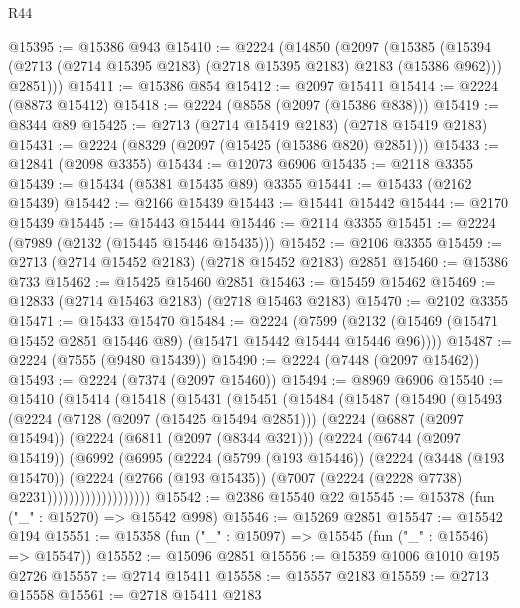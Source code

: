 \begin{lexlean}{R44}
\begin{coremodule}
@15395 := @15386 @943
@15410 := @2224
    (@14850
      (@2097
        (@15385
          (@15394 (@2713 (@2714 @15395 @2183) (@2718 @15395 @2183) @2183 (@15386 @962)))
          @2851)))
@15411 := @15386 @854
@15412 := @2097 @15411
@15414 := @2224 (@8873 @15412)
@15418 := @2224 (@8558 (@2097 (@15386 @838)))
@15419 := @8344 @89
@15425 := @2713 (@2714 @15419 @2183) (@2718 @15419 @2183)
@15431 := @2224 (@8329 (@2097 (@15425 (@15386 @820) @2851)))
@15433 := @12841 (@2098 @3355)
@15434 := @12073 @6906
@15435 := @2118 @3355
@15439 := @15434 (@5381 @15435 @89) @3355
@15441 := @15433 (@2162 @15439)
@15442 := @2166 @15439
@15443 := @15441 @15442
@15444 := @2170 @15439
@15445 := @15443 @15444
@15446 := @2114 @3355
@15451 := @2224 (@7989 (@2132 (@15445 @15446 @15435)))
@15452 := @2106 @3355
@15459 := @2713 (@2714 @15452 @2183) (@2718 @15452 @2183) @2851
@15460 := @15386 @733
@15462 := @15425 @15460 @2851
@15463 := @15459 @15462
@15469 := @12833 (@2714 @15463 @2183) (@2718 @15463 @2183)
@15470 := @2102 @3355
@15471 := @15433 @15470
@15484 := @2224
    (@7599 (@2132 (@15469 (@15471 @15452 @2851 @15446 @89) (@15471 @15442 @15444 @15446 @96))))
@15487 := @2224 (@7555 (@9480 @15439))
@15490 := @2224 (@7448 (@2097 @15462))
@15493 := @2224 (@7374 (@2097 @15460))
@15494 := @8969 @6906
@15540 := @15410
    (@15414
      (@15418
        (@15431
          (@15451
            (@15484
              (@15487
                (@15490
                  (@15493
                    (@2224
                      (@7128 (@2097 (@15425 @15494 @2851)))
                      (@2224
                        (@6887 (@2097 @15494))
                        (@2224
                          (@6811 (@2097 (@8344 @321)))
                          (@2224
                            (@6744 (@2097 @15419))
                            (@6992
                              (@6995
                                (@2224
                                  (@5799 (@193 @15446))
                                  (@2224
                                    (@3448 (@193 @15470))
                                    (@2224
                                      (@2766 (@193 @15435))
                                      (@7007 (@2224 (@2228 @7738) @2231)))))))))))))))))))
@15542 := @2386 @15540 @22
@15545 := @15378 (fun ("_" : @15270) => @15542 @998)
@15546 := @15269 @2851
@15547 := @15542 @194
@15551 := @15358 (fun ("_" : @15097) => @15545 (fun ("_" : @15546) => @15547))
@15552 := @15096 @2851
@15556 := @15359 @1006 @1010 @195 @2726
@15557 := @2714 @15411
@15558 := @15557 @2183
@15559 := @2713 @15558
@15561 := @2718 @15411 @2183

\end{coremodule}
\end{lexlean}
